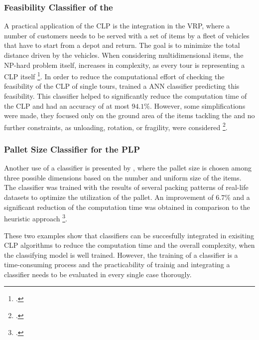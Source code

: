 \subsubsection{Feasibility Classifier of the }
A practical application of the \gls{CLP} is the integration in the \gls{VRP}, where
a number of customers needs to be served with a set of items by a fleet of vehicles that have
to start from a depot and return. The goal is to minimize the total distance driven
by the vehicles. When considering multidimensional items, the NP-hard problem itself,
increases in complexity, as every tour is representing a \gls{CLP} itself \footcite[cf.][pp. 1--2]{tamke_branch-and-cut_2024}.
In order to reduce the computational effort of checking the feasibility of the \gls{CLP}
of single tours, \citeauthor*{zhang_learning-based_2022} trained a \gls{ANN} classifier
predicting this feasibility. This classifier helped to significantly
reduce the computation time of the \gls{CLP} and had an accuracy of at most $94.1\%$.
However, some simplifications were made, they focused only on the ground area of the items
tackling the  and no further constraints, as unloading, rotation,
or fragility, were considered \footcite[cf.][pp. 4, 14]{zhang_learning-based_2022}.

\subsubsection{Pallet Size Classifier for the \gls{PLP}}
Another use of a classifier is presented by \citeauthor*{aylak_application_2021}, where the pallet
size is chosen among three possible dimensions based on the number and uniform size of the items.
The classifier was trained with the results of several packing patterns of real-life datasets
to optimize the utilization of the pallet. An improvement of $6.7\%$ and a significant reduction
of the computation time was obtained in comparison to the heuristic approach
\footcite[cf.][pp. 12--14]{aylak_application_2021}.\parbreak

These two examples show that classifiers can be succesfully integrated in exisiting \gls{CLP}
algorithms to reduce the computation time and the overall complexity, when the classifying model
is well trained. However, the training of a classifier is a time-consuming process and the
practicability of trainig and integrating a classifier needs to be evaluated in every single
case thorougly.

